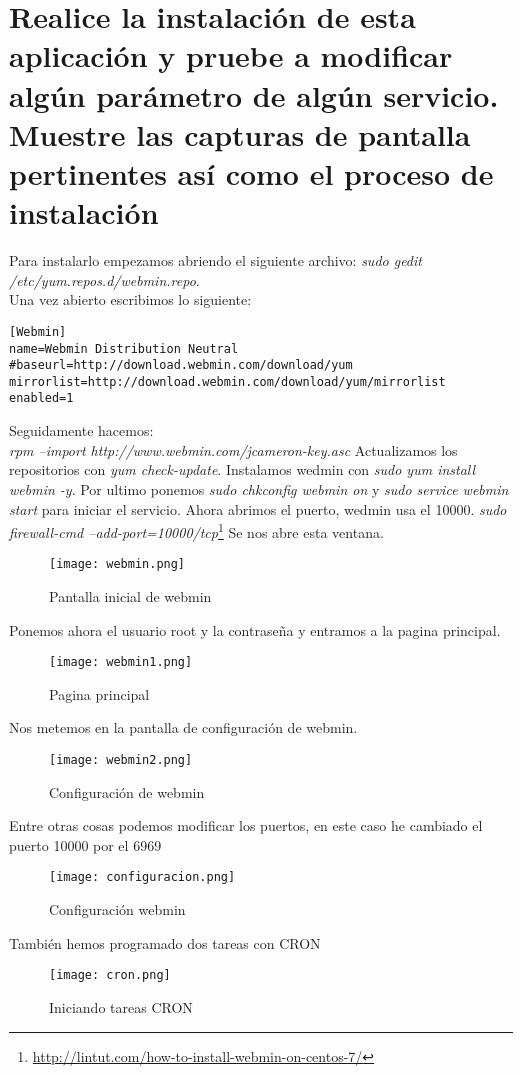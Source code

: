 \section{Realice la instalación de esta aplicación y pruebe a modificar algún parámetro de algún servicio. Muestre las capturas de pantalla pertinentes así como el proceso de instalación}
Para instalarlo empezamos abriendo el siguiente archivo: \textit{sudo gedit /etc/yum.repos.d/webmin.repo}.
\\Una vez abierto escribimos lo siguiente:
\begin{verbatim}
[Webmin]
name=Webmin Distribution Neutral
#baseurl=http://download.webmin.com/download/yum
mirrorlist=http://download.webmin.com/download/yum/mirrorlist
enabled=1
\end{verbatim}
Seguidamente hacemos:
\\\textit{rpm --import http://www.webmin.com/jcameron-key.asc
}
Actualizamos los repositorios con \textit{yum check-update}. Instalamos wedmin con \textit{sudo yum install webmin -y}. Por ultimo ponemos \textit{sudo chkconfig webmin on} y \textit{sudo service webmin start} para iniciar el servicio. Ahora abrimos el puerto, wedmin usa el 10000. \textit{sudo firewall-cmd --add-port=10000/tcp}\footnote{\url{http://lintut.com/how-to-install-webmin-on-centos-7/}}
Se nos abre esta ventana.
\begin{figure}[H] 
\centering
\texttt{[image: webmin.png]}  
\label{figura35:}
\caption{Pantalla inicial de webmin}
\end{figure}
Ponemos ahora el usuario root y la contraseña y entramos a la pagina principal.
\begin{figure}[H] 
\centering
\texttt{[image: webmin1.png]}  
\label{figura36:}
\caption{Pagina principal}
\end{figure}
Nos metemos en la pantalla de configuración de webmin.
\begin{figure}[H] 
\centering
\texttt{[image: webmin2.png]}  
\label{figura37:}
\caption{Configuración de webmin}
\end{figure}
Entre otras cosas podemos modificar los puertos, en este caso he cambiado el puerto 10000 por el 6969
\begin{figure}[H] 
\centering
\texttt{[image: configuracion.png]}  
\label{figura38:}
\caption{Configuración webmin}
\end{figure}
También hemos programado dos tareas con CRON
\begin{figure}[H] 
\centering
\texttt{[image: cron.png]}  
\label{figura39:}
\caption{Iniciando tareas CRON}
\end{figure}
